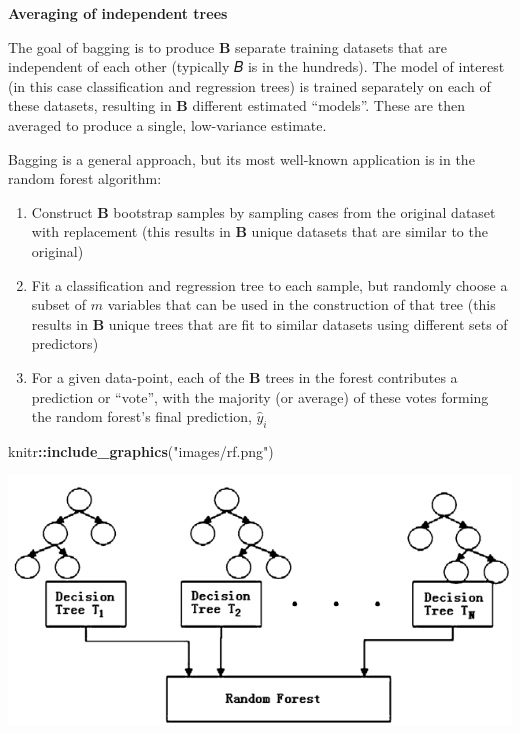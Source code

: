 \documentclass[
  a4paper,
  twoside,
  openright]{book}
\newenvironment{Shaded}{\begin{snugshade}}{\end{snugshade}}
\newcommand{\FunctionTok}[1]{\textcolor[rgb]{0.13,0.29,0.53}{\textbf{#1}}}
\newcommand{\NormalTok}[1]{#1}
\newcommand{\SpecialCharTok}[1]{\textcolor[rgb]{0.81,0.36,0.00}{\textbf{#1}}}
\newcommand{\StringTok}[1]{\textcolor[rgb]{0.31,0.60,0.02}{#1}}
\providecommand{\tightlist}{%
  \setlength{\itemsep}{0pt}\setlength{\parskip}{0pt}}
\theoremstyle{definition}
\theoremstyle{definition}
\theoremstyle{definition}
\theoremstyle{definition}
\theoremstyle{remark}
\begin{document}
\textbf{Averaging of independent trees}

The goal of bagging is to produce \(\boldsymbol{B}\) separate training datasets that are independent of each other (typically 𝐵 is in the hundreds). The model of interest (in this case classification and regression trees) is trained separately on each of these datasets, resulting in \(\boldsymbol{B}\) different estimated ``models''. These are then averaged to produce a single, low-variance estimate.

Bagging is a general approach, but its most well-known application is in the random forest algorithm:

\begin{enumerate}
\def\labelenumi{\arabic{enumi}.}
\tightlist
\item
  Construct \(\boldsymbol{B}\) bootstrap samples by sampling cases from the original dataset with replacement (this results in \(\boldsymbol{B}\) unique datasets that are similar to the original)
\item
  Fit a classification and regression tree to each sample, but randomly choose a subset of \(m\) variables that can be used in the construction of that tree (this results in \(\boldsymbol{B}\) unique trees that are fit to similar datasets using different sets of predictors)
\item
  For a given data-point, each of the \(\boldsymbol{B}\) trees in the forest contributes a prediction or ``vote'', with the majority (or average) of these votes forming the random forest's final prediction, \(\hat{y}_i\)
\end{enumerate}

\begin{Shaded}
\begin{Highlighting}[]
\NormalTok{knitr}\SpecialCharTok{::}\FunctionTok{include\_graphics}\NormalTok{(}\StringTok{"images/rf.png"}\NormalTok{)}
\end{Highlighting}
\end{Shaded}

\includegraphics[width=0.8\linewidth]{images/rf}
\end{document}
